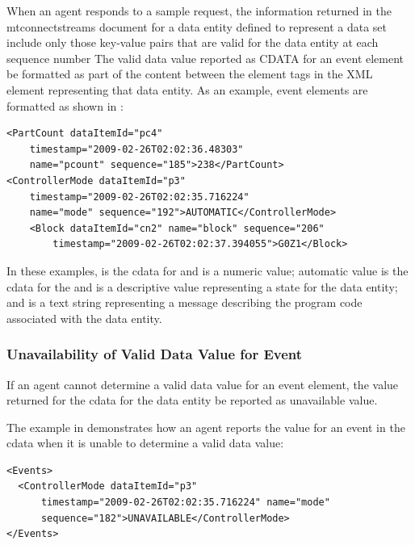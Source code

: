 When an \gls{agent} responds to a \gls{sample request}, the information returned in the \gls{mtconnectstreams} document for a \gls{data entity} defined to represent a \gls{data set} \MUST include only those \glspl{key-value pair} that are valid for the \gls{data entity} at each \gls{sequence number}
The \gls{valid data value} reported as CDATA for an \gls{event} element \must be formatted as part of the content between the element tags in the XML element representing that \gls{data entity}.  As an example, \gls{event} elements are formatted as shown in :

\begin{lstlisting}[firstnumber=1,escapechar=|,%
    caption={Example of Event Element},label={lst:example-of-event-element}]
<PartCount dataItemId="pc4" 
    timestamp="2009-02-26T02:02:36.48303"
    name="pcount" sequence="185">238</PartCount>
<ControllerMode dataItemId="p3" 
    timestamp="2009-02-26T02:02:35.716224"
    name="mode" sequence="192">AUTOMATIC</ControllerMode>
    <Block dataItemId="cn2" name="block" sequence="206"
        timestamp="2009-02-26T02:02:37.394055">G0Z1</Block>
\end{lstlisting}


In these examples,  is the \gls{cdata} for  and is a numeric value; \gls{automatic value} is the \gls{cdata} for the  and is a descriptive value representing a state for the \gls{data entity}; and  is a text string representing a message describing the program code associated with the  \gls{data entity}. 

\subsubsection{Unavailability of Valid Data Value for Event}

If an \gls{agent} cannot determine a \gls{valid data value} for an \gls{event} element, the value returned for the \gls{cdata} for the \gls{data entity} \must be reported as \gls{unavailable value}.

The example in  demonstrates how an \gls{agent} reports the value for an \gls{event} in the \gls{cdata} when it is unable to determine a \gls{valid data value}:  

\begin{lstlisting}[firstnumber=1,escapechar=|,%
    caption={Example of Event Element when data value is UNAVAILABLE},label={lst:example-of-event-element-unavailable}]
<Events>
  <ControllerMode dataItemId="p3" 
      timestamp="2009-02-26T02:02:35.716224" name="mode"
      sequence="182">UNAVAILABLE</ControllerMode>
</Events>
\end{lstlisting}


